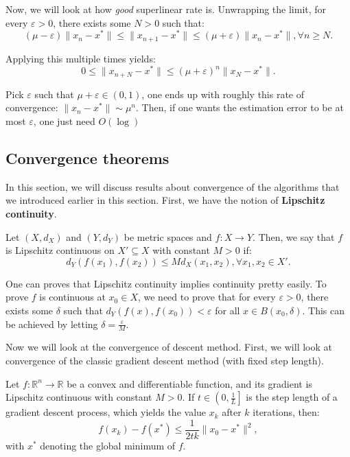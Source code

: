 Now, we will look at how \textit{good} superlinear rate is. Unwrapping the
limit, for every \( \varepsilon > 0 \), there exists some \( N > 0 \) such that:
\[
  (\mu - \varepsilon)\|x_{n}-x^{*}\| \le 
  \|x_{n+1}-x^{*}\| \le 
  (\mu + \varepsilon)\|x_{n}-x^{*}\|, \forall n \ge  N
.\]

Applying this multiple times yields:
\[
  0 \le \|x_{n + N} - x^{*}\| \le (\mu + \varepsilon)^{n}\|x_{N} - x^{*}\|
.\] 

Pick \( \varepsilon \) such that \( \mu + \varepsilon \in (0, 1) \), one ends up
with roughly this rate of convergence: \( \|x_{n} - x^{*}\| \sim
\mu^{n} \). Then, if one wants the estimation error to be at most \( \varepsilon
\), one just need \( O \left( \log  \right)  \)


\subsection{Convergence theorems} %
\label{sub:Convergence theorems}

In this section, we will discuss results about convergence of the algorithms
that we introduced earlier in this section. First, we have the notion of
\textbf{Lipschitz continuity}.

\begin{definition}
\label{def:Lipschitz continuity}
  Let \( (X, d_{X}) \) and \( (Y, d_{Y}) \) be metric spaces and \( f: X \to Y
  \). Then, we say that \( f \) is Lipschitz continuous on \( X' \subseteq X
  \) with constant \( M > 0 \) if:
  \[
    d_{Y}(f(x_{1}), f(x_{2})) \le Md_{X}(x_{1}, x_{2}), \forall  x_{1}, x_{2}
    \in X'
  .\] 
\end{definition}

One can proves that Lipschitz continuity implies continuity pretty easily. To
prove \( f \) is continuous at \( x_{0} \in X \), we need to prove that for
every \( \varepsilon > 0 \), there exists some \( \delta \) such that \(
d_{Y}(f(x), f(x_{0})) < \varepsilon \) for all \( x \in B(x_{0}, \delta) \).
This can be achieved by letting \( \delta = \frac{\varepsilon}{M} \).

Now we will look at the convergence of descent method. First, we will look at
convergence of the classic gradient descent method (with fixed step length).

\begin{theorem}
\label{thr:Convergence of gradient descent with fixed step length}
  Let \( f: \mathbb{R}^{n} \to \mathbb{R} \) be a convex and differentiable
  function, and its gradient is Lipschitz continuous with constant \( M > 0
  \). If \( t \in\left( 0, \frac{1}{L} \right]  \) is the step length of a
  gradient descent process, which yields the value \( x_{k} \) after \( k \)
  iterations, then:
  \[
    f(x_{k}) - f(x^{*}) \le \frac{1}{2tk}\|x_{0}-x^{*}\|^2
  ,\] with \( x^{*} \) denoting the global minimum of \( f \).
\end{theorem}

